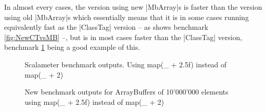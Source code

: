 In almost every cases, the version using new |MbArray|s is faster than the version using old |MbArray|s which essentially means that it is in some cases running equivalently fast as the |ClassTag| version -- as shows benchmark \ref{fig:NewCTvsMB} --, but is in most cases faster than the |ClassTag| version, benchmark \ref{fig:OtherCTvsMB} being a good example of this.  

\begin{figure}
\caption{Scalameter benchmark outputs. Using map(\_ + 2.5f) instead of map(\_ + 2)}
\label{fig:OtherCTvsMB}
\end{figure}

\begin{figure}
\caption{New benchmark outputs for ArrayBuffers of 10'000'000 elements using map(\_ + 2.5f) instead of map(\_ + 2)}
\label{fig:OtherGcComp}
\end{figure}